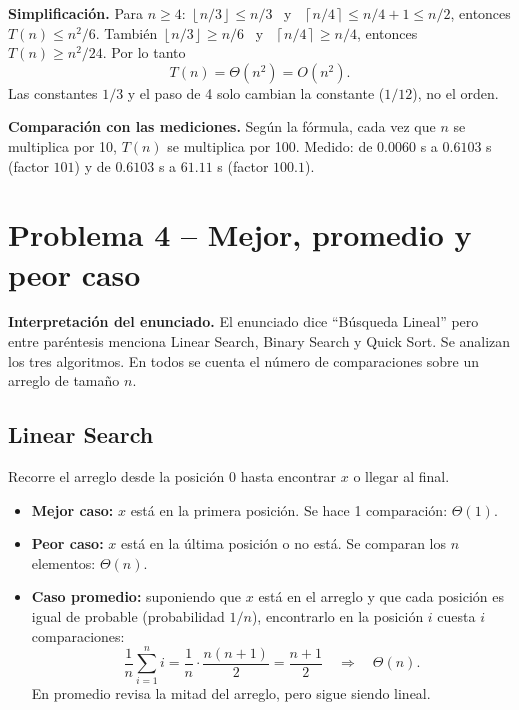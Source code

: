 \documentclass[11pt]{article}
\newcommand{\floor}[1]{\left\lfloor #1 \right\rfloor}
\newcommand{\ceil}[1]{\left\lceil #1 \right\rceil}
\begin{document}
\textbf{Simplificación.} Para $n \ge 4$: $\floor{n/3} \le n/3$ \ y \ $\ceil{n/4} \le n/4 + 1 \le n/2$, entonces $T(n) \le n^2/6$. También $\floor{n/3} \ge n/6$ \ y \ $\ceil{n/4} \ge n/4$, entonces $T(n) \ge n^2/24$. Por lo tanto
\[
\boxed{T(n) = \Theta(n^2)} = O(n^2).
\]
Las constantes $1/3$ y el paso de 4 solo cambian la constante ($1/12$), no el orden.

\textbf{Comparación con las mediciones.} Según la fórmula, cada vez que $n$ se multiplica por 10, $T(n)$ se multiplica por 100. Medido: de $0.0060$ s a $0.6103$ s (factor $101$) y de $0.6103$ s a $61.11$ s (factor $100.1$).

\section*{Problema 4 -- Mejor, promedio y peor caso}

\textbf{Interpretación del enunciado.} El enunciado dice ``Búsqueda Lineal'' pero entre paréntesis menciona Linear Search, Binary Search y Quick Sort. Se analizan los tres algoritmos. En todos se cuenta el número de comparaciones sobre un arreglo de tamaño $n$.

\subsection*{Linear Search}
Recorre el arreglo desde la posición 0 hasta encontrar $x$ o llegar al final.
\begin{itemize}
  \item \textbf{Mejor caso:} $x$ está en la primera posición. Se hace 1 comparación: $\Theta(1)$.
  \item \textbf{Peor caso:} $x$ está en la última posición o no está. Se comparan los $n$ elementos: $\Theta(n)$.
  \item \textbf{Caso promedio:} suponiendo que $x$ está en el arreglo y que cada posición es igual de probable (probabilidad $1/n$), encontrarlo en la posición $i$ cuesta $i$ comparaciones:
  \[
  \frac{1}{n}\sum_{i=1}^{n} i = \frac{1}{n}\cdot\frac{n(n+1)}{2} = \frac{n+1}{2} \quad\Rightarrow\quad \Theta(n).
  \]
  En promedio revisa la mitad del arreglo, pero sigue siendo lineal.
\end{itemize}
\end{document}
